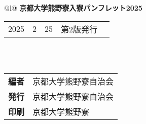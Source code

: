
\vspace*{\fill} %


\begin{flushleft}
  \begin{tabular*}{\textwidth}{@{}l@{\extracolsep{\fill}}}
      \textbf{\huge 京都大学熊野寮入寮パンフレット2025} \\
      \hline
      \begin{tabular}{@{}r@{年\kern.5zw}r@{月\kern.5zw}r@{日\kern1.5zw}ll}
          2025 &  2 & 25 & 第2版発行 & \\
      \end{tabular} \\
      \\
      \begin{tabular}{@{}l@{\kern.5zw\textbf{:}\kern1zw}l}
          \textbf{編者} & 京都大学熊野寮自治会 \\
          \textbf{発行} & 京都大学熊野寮自治会 \\
          \textbf{印刷} & 京都大学熊野寮 \\
      \end{tabular} \\
      \hline
  \end{tabular*}
\end{flushleft}